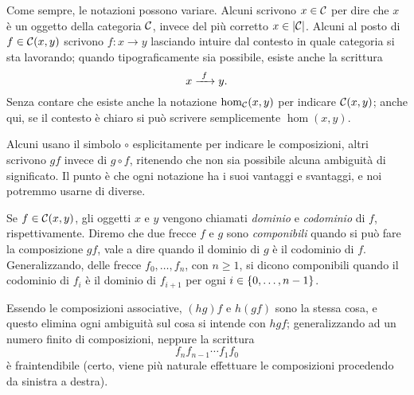 Come sempre, le notazioni possono variare. Alcuni scrivono \(x \in \mathcal C\) per dire che \(x\) è un oggetto della categoria \(\mathcal C\), invece del più corretto \(x \in \lvert\mathcal C\rvert\). Alcuni al posto di \(f \in \mathcal C(x,y)\) scrivono \(f : x \to y\) lasciando intuire dal contesto in quale categoria si sta lavorando; quando tipograficamente sia possibile, esiste anche la scrittura
\[x \xrightarrow{\ f\ } y .\]
Senza contare che esiste anche la notazione \(\hom_\mathcal C(x, y)\) per indicare \(\mathcal C(x, y)\); anche qui, se il contesto è chiaro si può scrivere semplicemente \(\hom(x, y)\).

Alcuni usano il simbolo \(\circ\) esplicitamente per indicare le composizioni, altri scrivono \(gf\) invece di \(g \circ f\), ritenendo che non sia possibile alcuna ambiguità di significato. Il punto è che ogni notazione ha i suoi vantaggi e svantaggi, e noi potremmo usarne di diverse.

Se \(f \in \mathcal C(x, y)\), gli oggetti \(x\) e \(y\) vengono chiamati {\em dominio} e {\em codominio} di \(f\), rispettivamente. Diremo che due frecce \(f\) e \(g\) sono {\em componibili} quando si può fare la composizione \(gf\), vale a dire quando il dominio di \(g\) è il codominio di \(f\). Generalizzando, delle frecce \(f_0, \dots{}, f_n\), con \(n \ge 1\), si dicono componibili quando il codominio di \(f_i\) è il dominio di \(f_{i+1}\) per ogni \(i \in \left\{0, \dots{}, n-1\right\}\).

Essendo le composizioni associative, \((hg)f\) e \(h(gf)\) sono la stessa cosa, e questo elimina ogni ambiguità sul cosa si intende con \(hgf\); generalizzando ad un numero finito di composizioni, neppure la scrittura
\[f_n f_{n-1}\cdots f_1f_0\]
è fraintendibile (certo, viene più naturale effettuare le composizioni procedendo da sinistra a destra).

